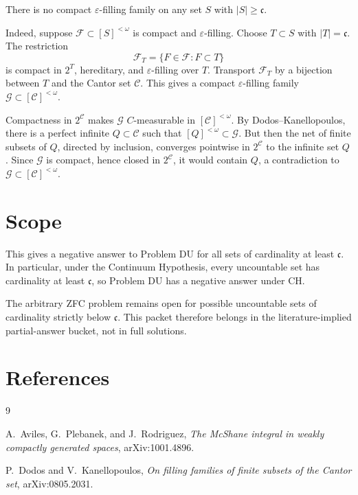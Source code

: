 \documentclass[11pt]{article}
\begin{document}
There is no compact \(\varepsilon\)-filling family on any set \(S\) with
\(|S|\ge\mathfrak c\).

Indeed, suppose \(\mathcal F\subset [S]^{<\omega}\) is compact and
\(\varepsilon\)-filling. Choose \(T\subset S\) with \(|T|=\mathfrak c\). The
restriction
\[
  \mathcal F_T=\{F\in\mathcal F:F\subset T\}
\]
is compact in \(2^T\), hereditary, and \(\varepsilon\)-filling over \(T\).
Transport \(\mathcal F_T\) by a bijection between \(T\) and the Cantor set
\(\mathcal C\). This gives a compact \(\varepsilon\)-filling family
\(\mathcal G\subset[\mathcal C]^{<\omega}\).

Compactness in \(2^{\mathcal C}\) makes \(\mathcal G\) \(C\)-measurable in
\([\mathcal C]^{<\omega}\). By Dodos--Kanellopoulos, there is a perfect
infinite \(Q\subset\mathcal C\) such that \([Q]^{<\omega}\subset\mathcal G\).
But then the net of finite subsets of \(Q\), directed by inclusion, converges
pointwise in \(2^{\mathcal C}\) to the infinite set \(Q\). Since \(\mathcal G\)
is compact, hence closed in \(2^{\mathcal C}\), it would contain \(Q\), a
contradiction to \(\mathcal G\subset[\mathcal C]^{<\omega}\).

\section*{Scope}

This gives a negative answer to Problem DU for all sets of cardinality at least
\(\mathfrak c\). In particular, under the Continuum Hypothesis, every
uncountable set has cardinality at least \(\mathfrak c\), so Problem DU has a
negative answer under CH.

The arbitrary ZFC problem remains open for possible uncountable sets of
cardinality strictly below \(\mathfrak c\). This packet therefore belongs in
the literature-implied partial-answer bucket, not in full solutions.

\section*{References}

\begin{thebibliography}{9}

A.~Aviles, G.~Plebanek, and J.~Rodriguez,
\emph{The McShane integral in weakly compactly generated spaces},
arXiv:1001.4896.

P.~Dodos and V.~Kanellopoulos,
\emph{On filling families of finite subsets of the Cantor set},
arXiv:0805.2031.

\end{thebibliography}
\end{document}

